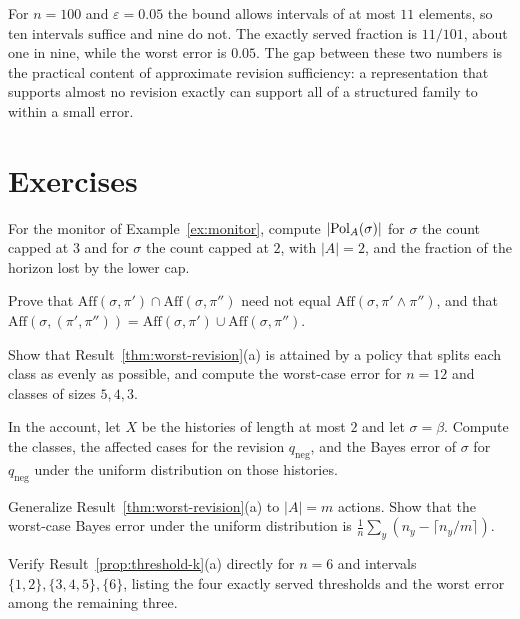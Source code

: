 For $n=100$ and $\varepsilon=0.05$ the bound allows intervals of at most $11$ elements, so ten intervals suffice and nine do not. The exactly served fraction is $11/101$, about one in nine, while the worst error is $0.05$. The gap between these two numbers is the practical content of approximate revision sufficiency: a representation that supports almost no revision exactly can support all of a structured family to within a small error.

\section*{Exercises}

\begin{exercise}
For the monitor of Example~\ref{ex:monitor}, compute $|\mathrm{Pol}_A(\sigma)|$ for $\sigma$ the count capped at $3$ and for $\sigma$ the count capped at $2$, with $|A|=2$, and the fraction of the horizon lost by the lower cap.
\end{exercise}

\begin{exercise}
Prove that $\mathrm{Aff}(\sigma,\pi')\cap\mathrm{Aff}(\sigma,\pi'')$ need not equal $\mathrm{Aff}(\sigma,\pi'\wedge\pi'')$, and that $\mathrm{Aff}(\sigma,(\pi',\pi''))=\mathrm{Aff}(\sigma,\pi')\cup\mathrm{Aff}(\sigma,\pi'')$.
\end{exercise}

\begin{exercise}
Show that Result~\ref{thm:worst-revision}(a) is attained by a policy that splits each class as evenly as possible, and compute the worst-case error for $n=12$ and classes of sizes $5,4,3$.
\end{exercise}

\begin{exercise}
In the account, let $X$ be the histories of length at most $2$ and let $\sigma=\beta$. Compute the classes, the affected cases for the revision $q_{\mathrm{neg}}$, and the Bayes error of $\sigma$ for $q_{\mathrm{neg}}$ under the uniform distribution on those histories.
\end{exercise}

\begin{exercise}
Generalize Result~\ref{thm:worst-revision}(a) to $|A|=m$ actions. Show that the worst-case Bayes error under the uniform distribution is $\frac1n\sum_y(n_y-\lceil n_y/m\rceil)$.
\end{exercise}


\begin{exercise}
Verify Result~\ref{prop:threshold-k}(a) directly for $n=6$ and intervals $\{1,2\},\{3,4,5\},\{6\}$, listing the four exactly served thresholds and the worst error among the remaining three.\label{ex:interval-check}
\end{exercise}

